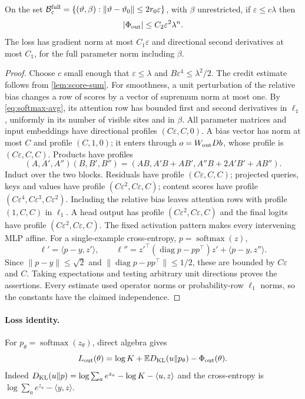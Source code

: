 \begin{lemma}\label{lem:bias-uniform}
On the set $\mathcal B^{\rm full}_\varepsilon=\{(\vartheta,\beta):\|\vartheta-\vartheta_0\|\le2r_0\varepsilon\}$, with $\beta$ unrestricted, if $\varepsilon\le c\lambda$ then
\[
 |\Phi_{\mathrm{out}}|\le C_2\varepsilon^2\lambda^n.
\]
The loss has gradient norm at most $C_1\varepsilon$ and directional second derivatives at most $C_1$, for the full parameter norm including $\beta$.
\end{lemma}
\begin{proof}
Choose $c$ small enough that $\varepsilon\le\lambda$ and $B\varepsilon^4\le\lambda^2/2$. The credit estimate follows from \cref{lem:score-sum}. For smoothness, a unit perturbation of the relative bias changes a row of scores by a vector of supremum norm at most one. By \eqref{eq:softmax-avg}, its attention row has bounded first and second derivatives in $\ell_1$, uniformly in its number of visible sites and in $\beta$. All parameter matrices and input embeddings have directional profiles $(C\varepsilon,C,0)$. A bias vector has norm at most $C$ and profile $(C,1,0)$; it enters through $o=W_{\rm out}D b$, whose profile is $(C\varepsilon,C,C)$. Products have profiles
\[
 (A,A',A'')(B,B',B'')=(AB,A'B+AB',A''B+2A'B'+AB'').
\]
Induct over the two blocks. Residuals have profile $(C\varepsilon,C,C)$; projected queries, keys and values have profile $(C\varepsilon^2,C\varepsilon,C)$; content scores have profile $(C\varepsilon^4,C\varepsilon^3,C\varepsilon^2)$. Including the relative bias leaves attention rows with profile $(1,C,C)$ in $\ell_1$. A head output has profile $(C\varepsilon^2,C\varepsilon,C)$ and the final logits have profile $(C\varepsilon^2,C\varepsilon,C)$. The fixed activation pattern makes every intervening MLP affine. For a single-example cross-entropy, $p=\operatorname{softmax}(z)$,
\[
 \ell'=\langle p-y,z'\rangle,\qquad
 \ell''=z'^\top(\operatorname{diag}p-pp^\top)z'+\langle p-y,z''\rangle.
\]
Since $\|p-y\|\le\sqrt2$ and $\|\operatorname{diag}p-pp^\top\|\le1/2$, these are bounded by $C\varepsilon$ and $C$. Taking expectations and testing arbitrary unit directions proves the assertions. Every estimate used operator norms or probability-row $\ell_1$ norms, so the constants have the claimed independence.
\end{proof}
\label{lem:end-smooth}

\paragraph{Loss identity.}\label{app:end}
For $p_\theta=\operatorname{softmax}(z_\theta)$, direct algebra gives
\begin{equation}
 L_{\rm out}(\theta)=\log K+\mathbb E D_{\rm KL}(u\|p_\theta)-\Phi_{\mathrm{out}}(\theta).
 \label{eq:lo-identity}
\end{equation}
Indeed $D_{\rm KL}(u\|p)=\log\sum_a e^{z_a}-\log K-\langle u,z\rangle$ and the cross-entropy is $\log\sum_a e^{z_a}-\langle y,z\rangle$.

